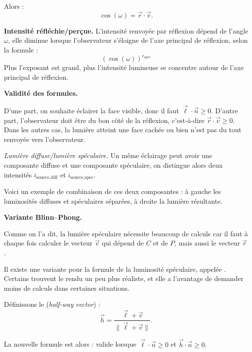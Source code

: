 \documentclass[11pt,class=report,crop=false]{standalone}
\begin{document}
Alors :
$$\cos(\omega) = \vec r \cdot \vec v.$$

\medskip
\textbf{Intensité réfléchie/perçue.}
L'intensité renvoyée par réflexion dépend de l'angle $\omega$, elle diminue lorsque l'observateur s'éloigne de l'axe principal de réflexion, selon la formule :
$$(\cos(\omega))^{e_{\text{spec}}}$$
Plus l'exposant est grand, plus l'intensité lumineuse se concentre autour de l'axe principal de réflexion.



\medskip
\textbf{Validité des formules.}

D'une part, on souhaite éclairer la face visible, donc il faut $\vec \ell \cdot \vec n \ge 0$. D'autre part, l'observateur doit être du \og{}bon\fg{} côté de la réflexion, c'est-à-dire $\vec r \cdot \vec v \ge 0$. Dans les autres cas, la lumière atteint une face cachée ou bien n'est pas du tout renvoyée vers l'observateur.

\bigskip
\emph{Lumière diffuse/lumière spéculaire.}
Un même éclairage peut avoir une composante diffuse et une composante spéculaire, on distingue alors deux intensités $i_{\text{source,diff}}$ et $i_{\text{source,spec}}$.

Voici un exemple de combinaison de ces deux composantes : à gauche les luminosités diffuses et spéculaires séparées, à droite la lumière résultante.

\medskip
\textbf{Variante Blinn--Phong.}


Comme on l'a dit, la lumière spéculaire nécessite beaucoup de calculs car il faut à chaque fois calculer le vecteur $\vec v$ qui dépend de $C$ et de $P$, mais aussi le vecteur $\vec r$.

Il existe une variante pour la formule de la luminosité spéculaire, appelée . Certains trouvent le rendu un peu plus réaliste, et elle a l'avantage de demander moins de calculs dans certaines situations.

Définissons le  (\emph{half-way vector}) : 
$$\vec h = \frac{\vec \ell + \vec v}{\|\vec \ell + \vec v\|}.$$


La nouvelle formule est alors :
valide lorsque  $\vec\ell \cdot \vec n \ge 0$ et $\vec h \cdot \vec n \ge 0$.
\end{document}
